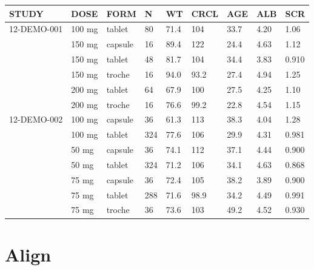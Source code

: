 \documentclass[
]{article}
\newenvironment{Shaded}{\begin{snugshade}}{\end{snugshade}}
\newcommand{\ControlFlowTok}[1]{\textcolor[rgb]{0.13,0.29,0.53}{\textbf{#1}}}
\newcommand{\DataTypeTok}[1]{\textcolor[rgb]{0.13,0.29,0.53}{#1}}
\newcommand{\KeywordTok}[1]{\textcolor[rgb]{0.13,0.29,0.53}{\textbf{#1}}}
\newcommand{\NormalTok}[1]{#1}
\newcommand{\OperatorTok}[1]{\textcolor[rgb]{0.81,0.36,0.00}{\textbf{#1}}}
\newcommand{\StringTok}[1]{\textcolor[rgb]{0.31,0.60,0.02}{#1}}
\begin{document}
\begin{table}[h]
\centering
{\def\arraystretch{1.4}\tabcolsep=5pt
\begin{threeparttable}
\begin{tabular}[h]{lllllllll}
\hline
STUDY & DOSE & FORM & N & WT & CRCL & AGE & ALB & SCR \\
\hline
12-DEMO-001 & 100 mg & tablet & 80 & 71.4 & 104 & 33.7 & 4.20 & 1.06 \\
 & 150 mg & capsule & 16 & 89.4 & 122 & 24.4 & 4.63 & 1.12 \\
 & 150 mg & tablet & 48 & 81.7 & 104 & 34.4 & 3.83 & 0.910 \\
 & 150 mg & troche & 16 & 94.0 & 93.2 & 27.4 & 4.94 & 1.25 \\
 & 200 mg & tablet & 64 & 67.9 & 100 & 27.5 & 4.25 & 1.10 \\
 & 200 mg & troche & 16 & 76.6 & 99.2 & 22.8 & 4.54 & 1.15 \\ \hline
12-DEMO-002 & 100 mg & capsule & 36 & 61.3 & 113 & 38.3 & 4.04 & 1.28 \\
 & 100 mg & tablet & 324 & 77.6 & 106 & 29.9 & 4.31 & 0.981 \\
 & 50 mg & capsule & 36 & 74.1 & 112 & 37.1 & 4.44 & 0.900 \\
 & 50 mg & tablet & 324 & 71.2 & 106 & 34.1 & 4.63 & 0.868 \\
 & 75 mg & capsule & 36 & 72.4 & 105 & 38.2 & 3.89 & 0.900 \\
 & 75 mg & tablet & 288 & 71.6 & 98.9 & 34.2 & 4.49 & 0.991 \\
 & 75 mg & troche & 36 & 73.6 & 103 & 49.2 & 4.52 & 0.930 \\
\hline
\end{tabular}
\end{threeparttable}
}
\end{table}

\begin{Shaded}
\end{Shaded}

\clearpage

\hypertarget{align}{%
\section{Align}\label{align}}
\end{document}

